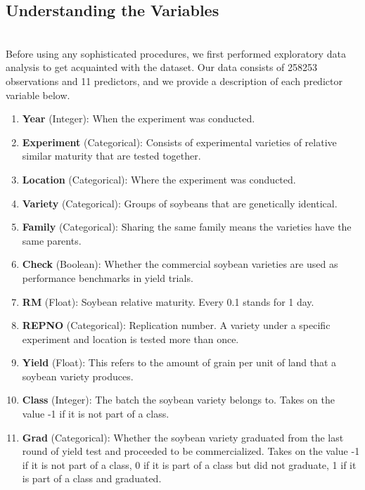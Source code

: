 \documentclass[psamsfonts]{amsart}
\begin{document}
\subsection*{Understanding the Variables}
\hfill \\

 Before using any sophisticated procedures, we first performed exploratory data analysis to get acquainted with the dataset. Our data consists of 258253 observations and 11 predictors, and we provide a description of each predictor variable below.\\

\begin{enumerate}
    \item \textbf{Year} (Integer): When the experiment was conducted.
    \item \textbf{Experiment} (Categorical): Consists of experimental varieties of relative similar maturity that are tested together.
    \item \textbf{Location} (Categorical): Where the experiment was conducted. 
    \item \textbf{Variety} (Categorical): Groups of soybeans that are genetically identical. 
    \item \textbf{Family} (Categorical): Sharing the same family means the varieties have the same parents.
    \item \textbf{Check} (Boolean): Whether the commercial soybean varieties are used as performance benchmarks in yield trials. 
    \item \textbf{RM} (Float): Soybean relative maturity. Every 0.1 stands for 1 day.
    \item \textbf{REPNO} (Categorical): Replication number. A variety under a specific experiment and location is tested more than once.
    \item \textbf{Yield} (Float): This refers to the amount of grain per unit of land that a soybean variety produces. 
    \item \textbf{Class} (Integer): The batch the soybean variety belongs to. Takes on the value -1 if it is not part of a class.
    \item \textbf{Grad} (Categorical): Whether the soybean variety graduated from the last round of yield test and proceeded to be commercialized. Takes on the value -1 if it is not part of a class, 0 if it is part of a class but did not graduate, 1 if it is part of a class and graduated.\\
\end{enumerate}
\end{document}
